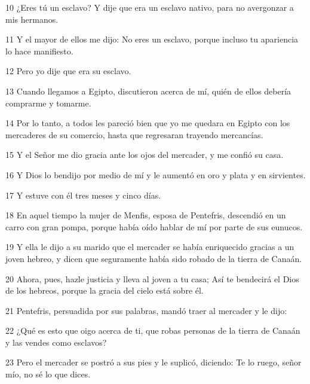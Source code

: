 \par 10 ¿Eres tú un esclavo? Y dije que era un esclavo nativo, para no avergonzar a mis hermanos.

\par 11 Y el mayor de ellos me dijo: No eres un esclavo, porque incluso tu apariencia lo hace manifiesto.

\par 12 Pero yo dije que era su esclavo.

\par 13 Cuando llegamos a Egipto, discutieron acerca de mí, quién de ellos debería comprarme y tomarme.

\par 14 Por lo tanto, a todos les pareció bien que yo me quedara en Egipto con los mercaderes de su comercio, hasta que regresaran trayendo mercancías.

\par 15 Y el Señor me dio gracia ante los ojos del mercader, y me confió su casa.

\par 16 Y Dios lo bendijo por medio de mí y le aumentó en oro y plata y en sirvientes.

\par 17 Y estuve con él tres meses y cinco días.

\par 18 En aquel tiempo la mujer de Menfis, esposa de Pentefris, descendió en un carro con gran pompa, porque había oído hablar de mí por parte de sus eunucos.

\par 19 Y ella le dijo a su marido que el mercader se había enriquecido gracias a un joven hebreo, y dicen que seguramente había sido robado de la tierra de Canaán.

\par 20 Ahora, pues, hazle justicia y lleva al joven a tu casa; Así te bendecirá el Dios de los hebreos, porque la gracia del cielo está sobre él.

\par 21 Pentefris, persuadida por sus palabras, mandó traer al mercader y le dijo:

\par 22 ¿Qué es esto que oigo acerca de ti, que robas personas de la tierra de Canaán y las vendes como esclavos?

\par 23 Pero el mercader se postró a sus pies y le suplicó, diciendo: Te lo ruego, señor mío, no sé lo que dices.


